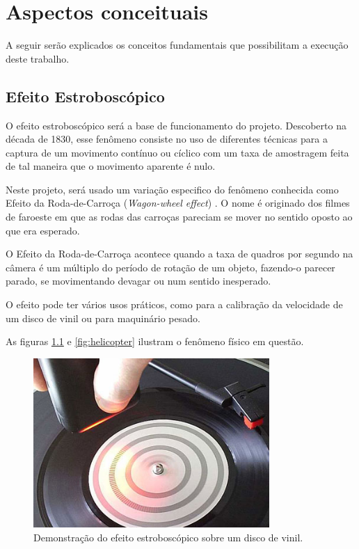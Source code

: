 \chapter{Aspectos conceituais}
\label{CAP2}


A seguir serão explicados os conceitos fundamentais que possibilitam a execução deste trabalho. 


\section{Efeito Estroboscópico}

O efeito estroboscópico será a base de funcionamento do projeto. Descoberto na década de 1830, esse fenômeno consiste no uso de diferentes técnicas para a captura de um movimento contínuo ou cíclico com um taxa de amostragem feita de tal maneira que o  movimento aparente é nulo.

Neste projeto, será usado um variação especifico do fenômeno conhecida como Efeito da Roda-de-Carroça (\textit{Wagon-wheel effect}) \cite{tessive}. O nome é originado dos filmes de faroeste em que as rodas das carroças pareciam se mover no sentido oposto ao que era esperado\cite{wagon_wheel}.

O Efeito da Roda-de-Carroça  acontece quando a taxa de quadros por segundo na câmera é um múltiplo do período de rotação de um objeto, fazendo-o parecer parado, se movimentando devagar ou num sentido inesperado. 

O efeito pode ter vários usos práticos, como para a calibração da velocidade de um disco de vinil ou para maquinário pesado.

As figuras \ref{fig:vinil} e \ref{fig:helicopter} ilustram o fenômeno físico em questão.

\begin{figure}[H]
    \centering
    \includegraphics[width=0.8\textwidth,angle=0]{figures/strobe_3.jpg}
    \caption{Demonstração do efeito estroboscópico sobre um disco de vinil.}
    \label{fig:vinil}
\end{figure}

